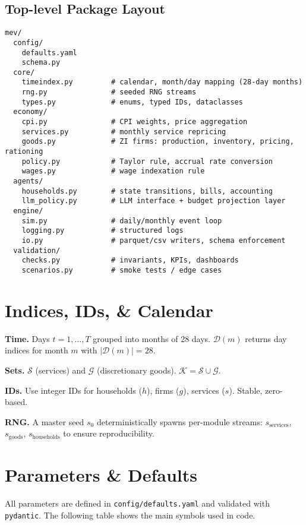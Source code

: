 \documentclass[12pt]{article}
\begin{document}
\subsection*{Top-level Package Layout}
\begin{verbatim}
mev/
  config/
    defaults.yaml
    schema.py
  core/
    timeindex.py         # calendar, month/day mapping (28-day months)
    rng.py               # seeded RNG streams
    types.py             # enums, typed IDs, dataclasses
  economy/
    cpi.py               # CPI weights, price aggregation
    services.py          # monthly service repricing
    goods.py             # ZI firms: production, inventory, pricing, rationing
    policy.py            # Taylor rule, accrual rate conversion
    wages.py             # wage indexation rule
  agents/
    households.py        # state transitions, bills, accounting
    llm_policy.py        # LLM interface + budget projection layer
  engine/
    sim.py               # daily/monthly event loop
    logging.py           # structured logs
    io.py                # parquet/csv writers, schema enforcement
  validation/
    checks.py            # invariants, KPIs, dashboards
    scenarios.py         # smoke tests / edge cases
\end{verbatim}

\section{Indices, IDs, \& Calendar}
\textbf{Time.} Days $t=1,\dots,T$ grouped into months of 28 days. $\mathcal{D}(m)$ returns day indices for month $m$ with $\lvert \mathcal{D}(m)\rvert=28$.

\textbf{Sets.} $\mathcal{S}$ (services) and $\mathcal{G}$ (discretionary goods). $\mathcal{K}=\mathcal{S}\cup\mathcal{G}$.

\textbf{IDs.} Use integer IDs for households ($h$), firms ($g$), services ($s$). Stable, zero-based.

\textbf{RNG.} A master seed $s_0$ deterministically spawns per-module streams: $s_{\text{services}}$, $s_{\text{goods}}$, $s_{\text{households}}$ to ensure reproducibility.

\section{Parameters \& Defaults}
All parameters are defined in \texttt{config/defaults.yaml} and validated with \texttt{pydantic}. The following table shows the main symbols used in code.
\end{document}
